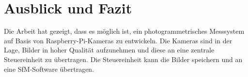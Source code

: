 \documentclass[./00PhotoBox.tex]{subfiles}
\begin{document}
\chapter{Ausblick und Fazit}

Die Arbeit hat gezeigt, dass es möglich ist, ein photogrammetrisches Messsystem auf Basis von Raspberry-Pi-Kameras zu entwickeln. Die Kameras sind in der Lage, Bilder in hoher Qualität aufzunehmen und diese an eine zentrale Steuereinheit zu übertragen. Die Steuereinheit kann die Bilder speichern und an eine \gls{SfM}-Software übertragen.




\biblio
\end{document}
